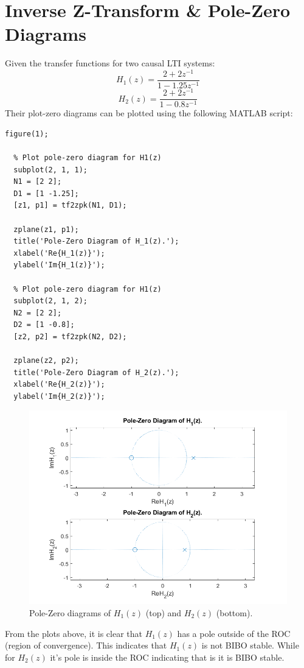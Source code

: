 \documentclass[a4paper, 10pt]{article}
\begin{document}
\section{Inverse Z-Transform \& Pole-Zero Diagrams}
Given the transfer functions for two causal LTI systems:
\begin{equation}
  H_1(z) = \frac {2+2z^{-1}} {1-1.25z^{-1}}
\end{equation}
\begin{equation}
  H_2(z) = \frac {2+2z^{-1}} {1-0.8z^{-1}}
\end{equation}
Their plot-zero diagrams can be plotted using the following MATLAB script:
\begin{lstlisting}[style=Matlab-editor, basicstyle=\small\ttfamily]
  figure(1);

  % Plot pole-zero diagram for H1(z)
  subplot(2, 1, 1);
  N1 = [2 2];
  D1 = [1 -1.25];
  [z1, p1] = tf2zpk(N1, D1);
  
  zplane(z1, p1);
  title('Pole-Zero Diagram of H_1(z).');
  xlabel('Re{H_1(z)}');
  ylabel('Im{H_1(z)}');
  
  % Plot pole-zero diagram for H1(z)
  subplot(2, 1, 2);
  N2 = [2 2];
  D2 = [1 -0.8];
  [z2, p2] = tf2zpk(N2, D2);
  
  zplane(z2, p2);
  title('Pole-Zero Diagram of H_2(z).');
  xlabel('Re{H_2(z)}');
  ylabel('Im{H_2(z)}');
\end{lstlisting}
\begin{figure}[H]
  \centering
  \includegraphics[width=12cm]{images/q2_a.png}
  \caption{Pole-Zero diagrams of $H_1(z)$ (top) and $H_2(z)$ (bottom).}
\end{figure}
From the plots above, it is clear that $H_1(z)$ has a pole outside of the ROC (region of convergence). This 
indicates that $H_1(z)$ is not BIBO stable. While for $H_2(z)$ it's pole is inside the ROC indicating that is it 
is BIBO stable.
\end{document}
